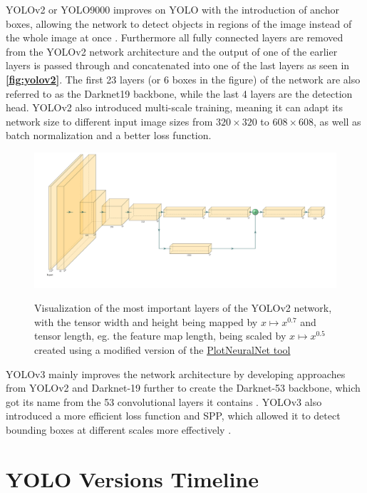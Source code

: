 \documentclass[10pt]{book}
\newcommand{\figureref}[1]{\textbf{\autoref{#1}}}
\begin{document}
\ac{YOLO}v2 or \ac{YOLO}9000 improves on \ac{YOLO} with the introduction of anchor boxes, allowing the network to detect objects in regions of the image instead of the whole image at once \cite{redmon2017yolo9000}. Furthermore all fully connected layers are removed from the \ac{YOLO}v2 network architecture and the output of one of the earlier layers is passed through and concatenated into one of the last layers as seen in \figureref{fig:yolov2}. The first 23 layers (or 6 boxes in the figure) of the network are also referred to as the Darknet19 backbone, while the last 4 layers are the detection head. \ac{YOLO}v2 also introduced multi-scale training, meaning it can adapt its network size to different input image sizes from $320 \times 320$ to $608 \times 608$, as well as batch normalization and a better loss function.

\begin{figure}
  \caption{Visualization of the most important layers of the \ac{YOLO}v2 network, with the tensor width and height being mapped by $x \mapsto x^{0.7}$ and tensor length, eg. the feature map length, being scaled by $x \mapsto x^{0.5}$ created using a modified version of the \href{https://github.com/jnccd/PlotNeuralNet}{PlotNeuralNet tool} \cite{haris_iqbal_2018_2526396}}
  \includegraphics[width=\textwidth]{image/yolov2}
  \label{fig:yolov2}
\end{figure}

\ac{YOLO}v3 mainly improves the network architecture by developing approaches from \ac{YOLO}v2 and Darknet-19 further to create the Darknet-53 backbone, which got its name from the 53 convolutional layers it contains \cite{redmon2018yolov3}. \ac{YOLO}v3 also introduced a more efficient loss function and \ac{SPP}, which allowed it to detect bounding boxes at different scales more effectively \cite{jani2023model}.

\section{YOLO Versions Timeline}
\end{document}
